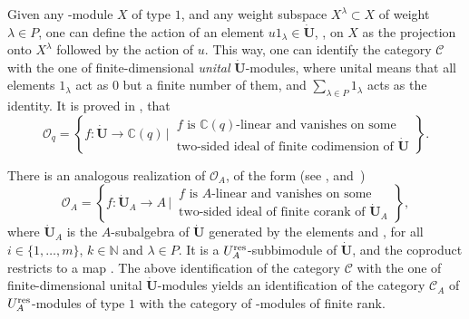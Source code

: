 \documentclass[pdftex]{sigma}
\numberwithin{equation}{section}
\theoremstyle{definition}
\newcommand{\mc}{\mathbb{C}}
\newcommand{\mn}{\mathbb{N}}
\newcommand{\Oo}{{\mathcal O}}
\newcommand{\ra}{\rightarrow}
\begin{document}
Given any -module $X$ of type $1$, and any weight subspace $X^\lambda\subset X$ of weight $\lambda\in P$, one can define the action of an element $u 1_\lambda \in \dot{\mathbf{U}}$, , on $X$ as the projection onto $X^\lambda$ followed by the action of $u$. This way, one can identify the category $\mathcal{C}$ with the one of finite-dimensional {\it unital} $\dot{\mathbf{U}}$-modules, where unital means that all elements $1_\lambda$ act as $0$ but a finite number of them, and $ \sum_{\lambda\in P} 1_\lambda$ acts as the identity. It is proved in \cite[Section~29.5.1]{Lusztig}, that
\[%
\Oo_q = \left\lbrace f\colon \dot{\mathbf{U}} \ra \mc(q) \, \bigg\vert \, \begin{matrix} \text{$f$ is $\mc(q)$-linear and vanishes on some}\\ \text{two-sided ideal of finite codimension of $\dot{\mathbf{U}}$} \end{matrix}\right\rbrace.
\]

There is an analogous realization of $\Oo_A$, of the form (see \cite[Sections~23.2 and~29.5.2]{Lusztig}, and~\cite{Lusztig3})
\[%
\Oo_A = \left\lbrace f\colon \dot{\mathbf{U}}_A \ra A \, \bigg\vert \, \begin{matrix} \text{$f$ is $A$-linear and vanishes on some}\\ \text{two-sided ideal of finite corank of $\dot{\mathbf{U}}_A$} \end{matrix}\right\rbrace ,
\]
where $\dot{\mathbf{U}}_A$ is the $A$-subalgebra of $\dot{\mathbf{U}}$ generated by the elements  and , for all $i\in \{1,\dots,m\}$, $k\in \mn$ and $\lambda \in P$. It is a $U_A^{\rm res}$-subbimodule of $\dot{\mathbf{U}}$, and the coproduct restricts to a map \smash{$\Delta \colon \dot{\mathbf{U}}_A \ra \dot{\mathbf{U}}_A {}^{\hat{\otimes}2}$}. The above identification of the category $\mathcal{C}$ with the one of finite-dimensional unital $\dot{\mathbf{U}}$-modules yields an identification of the category $\mathcal{C}_A$ of $U_A^{\rm res}$-modules of type $1$ with the category of -modules of finite rank.
\end{document}
